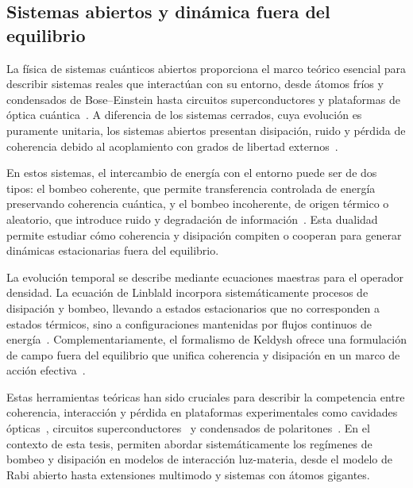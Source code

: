 \documentclass[onecolumn,notitlepage,letterpaper,aps,pra,12pt]{article}
\numberwithin{equation}{section}
\begin{document}
\subsection{Sistemas abiertos y dinámica fuera del equilibrio}

La física de sistemas cuánticos abiertos proporciona el marco teórico esencial para describir sistemas reales que interactúan con su entorno, desde átomos fríos y condensados de Bose–Einstein hasta circuitos superconductores y plataformas de óptica cuántica~\cite{rotter2015}. A diferencia de los sistemas cerrados, cuya evolución es puramente unitaria, los sistemas abiertos presentan disipación, ruido y pérdida de coherencia debido al acoplamiento con grados de libertad externos~\cite{Sieberer2016,breuer2003}.

En estos sistemas, el intercambio de energía con el entorno puede ser de dos tipos: el bombeo coherente, que permite transferencia controlada de energía preservando coherencia cuántica, y el bombeo incoherente, de origen térmico o aleatorio, que introduce ruido y degradación de información~\cite{carmichael2013}. Esta dualidad permite estudiar cómo coherencia y disipación compiten o cooperan para generar dinámicas estacionarias fuera del equilibrio.

La evolución temporal se describe mediante ecuaciones maestras para el operador densidad. La ecuación de Linblald incorpora sistemáticamente procesos de disipación y bombeo, llevando a estados estacionarios que no corresponden a estados térmicos, sino a configuraciones mantenidas por flujos continuos de energía~\cite{Li2014,Fazio2025}. Complementariamente, el formalismo de Keldysh ofrece una formulación de campo fuera del equilibrio que unifica coherencia y disipación en un marco de acción efectiva~\cite{Sieberer2016,chakraborty2018}.

Estas herramientas teóricas han sido cruciales para describir la competencia entre coherencia, interacción y pérdida en plataformas experimentales como cavidades ópticas~\cite{torres2013}, circuitos superconductores~\cite{feigelman2000} y condensados de polaritones~\cite{dunnet2016}. En el contexto de esta tesis, permiten abordar sistemáticamente los regímenes de bombeo y disipación en modelos de interacción luz-materia, desde el modelo de Rabi abierto hasta extensiones multimodo y sistemas con átomos gigantes.

\end{document}
